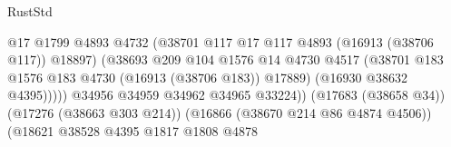 \begin{lexlean}{RustStd}
\begin{coremodule}
                                                          @17
                                                          @1799
                                                          @4893
                                                          @4732
                                                          (@38701
                                                            @117
                                                            @17
                                                            @117
                                                            @4893
                                                            (@16913 (@38706 @117))
                                                            @18897)
                                                          (@38693
                                                            @209
                                                            @104
                                                            @1576
                                                            @14
                                                            @4730
                                                            @4517
                                                            (@38701
                                                              @183
                                                              @1576
                                                              @183
                                                              @4730
                                                              (@16913 (@38706 @183))
                                                              @17889)
                                                            (@16930 @38632 @4395)))))
                                                    @34956
                                                    @34959
                                                    @34962
                                                    @34965
                                                    @33224))
                                                (@17683 (@38658 @34))
                                                (@17276 (@38663 @303 @214))
                                                (@16866 (@38670 @214 @86 @4874 @4506))
                                                (@18621
                                                  @38528
                                                  @4395
                                                  @1817
                                                  @1808
                                                  @4878

\end{coremodule}
\end{lexlean}
